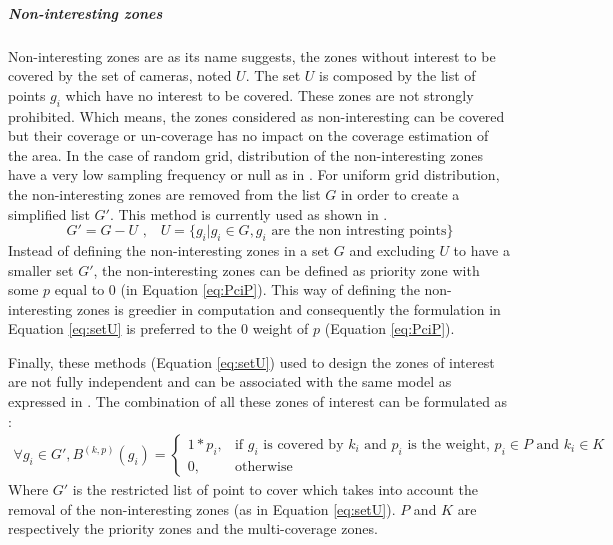 \subparagraph{Non-interesting zones}\label{subsec:obstacleZone}
Non-interesting zones are as its name suggests, the zones without interest to be covered by the set of cameras, noted $U$. The set $U$ is composed by the list of points $g_i$ which have no interest to be covered. These zones are not strongly prohibited. Which means, the zones considered as non-interesting can be covered but their coverage or un-coverage has no impact on the coverage estimation of the area. In the case of random grid, distribution of the non-interesting zones have a very low sampling frequency or null as in \citep{141*akbarzadeh2013}. For uniform grid distribution, the non-interesting zones are removed from the list $G$ in order to create a simplified list $G'$. This method is currently used as shown in \cite{22*zhao2008,170*yabuta2008,141*akbarzadeh2013,171*horster2006,84*xu2011}. 
\begin{equation}\label{eq:setU}
G'=G-U \mbox{ ,    }  \mbox{ }U= \{ g_i | g_i \in G, g_i \mbox{ are the non intresting points} \}
\end{equation}
Instead of defining the non-interesting zones in a set $G$ and excluding $U$ to have a smaller set $G'$, the non-interesting zones can be defined as priority zone with some $p$ equal to $0$ (in Equation \ref{eq:PciP}). This way of defining the non-interesting zones is greedier in computation and consequently the formulation in Equation \ref{eq:setU} is preferred  to the  0 weight of $p$ (Equation \ref{eq:PciP}). 

Finally, these methods (Equation \ref{eq:setU}) used to design the zones of interest are not fully independent and can be associated with the same model as expressed in \cite{141*akbarzadeh2013,171*horster2006,84*xu2011}. The combination of all these zones of interest can be formulated as : 
 \begin{align}\label{eq:PcFull}
\forall g_i \in G', B^{(k,p)}(g_i)= \begin{cases} 1*p_i, & \mbox{if } g_i\mbox{ is covered  by $k_i$ and  $p_i$ is the weight, } p_i \in P \mbox{ and } k_i \in K \\ 0, & \mbox{otherwise}  \end{cases}
\end{align}
Where $G'$ is the restricted list of point to cover which takes  into account the removal of the non-interesting zones (as in Equation \ref{eq:setU}). $P$ and $K$ are respectively the priority zones and the  multi-coverage zones.
   
